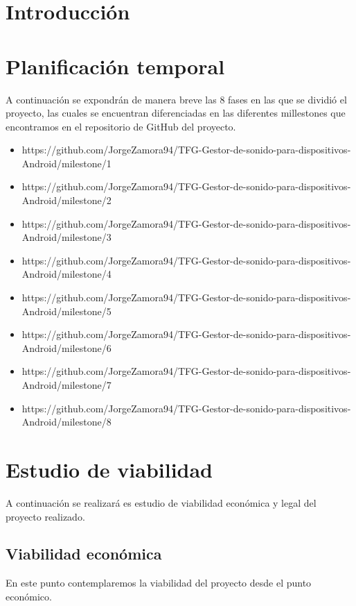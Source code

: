 
\section{Introducción}

\section{Planificación temporal}
A continuación se expondrán de manera breve las 8 fases en las que se dividió el proyecto, las cuales se encuentran diferenciadas en las diferentes millestones que encontramos en el repositorio de GitHub del proyecto.

\begin{itemize}
	\item https://github.com/JorgeZamora94/TFG-Gestor-de-sonido-para-dispositivos-Android/milestone/1
	\item https://github.com/JorgeZamora94/TFG-Gestor-de-sonido-para-dispositivos-Android/milestone/2
	\item https://github.com/JorgeZamora94/TFG-Gestor-de-sonido-para-dispositivos-Android/milestone/3
	\item https://github.com/JorgeZamora94/TFG-Gestor-de-sonido-para-dispositivos-Android/milestone/4
	\item https://github.com/JorgeZamora94/TFG-Gestor-de-sonido-para-dispositivos-Android/milestone/5
	\item https://github.com/JorgeZamora94/TFG-Gestor-de-sonido-para-dispositivos-Android/milestone/6
	\item https://github.com/JorgeZamora94/TFG-Gestor-de-sonido-para-dispositivos-Android/milestone/7
	\item https://github.com/JorgeZamora94/TFG-Gestor-de-sonido-para-dispositivos-Android/milestone/8
\end{itemize}



\section{Estudio de viabilidad}
A continuación se realizará es estudio de viabilidad económica y legal del proyecto realizado.
\subsection{Viabilidad económica}
En este punto contemplaremos la viabilidad del proyecto desde el punto económico.
